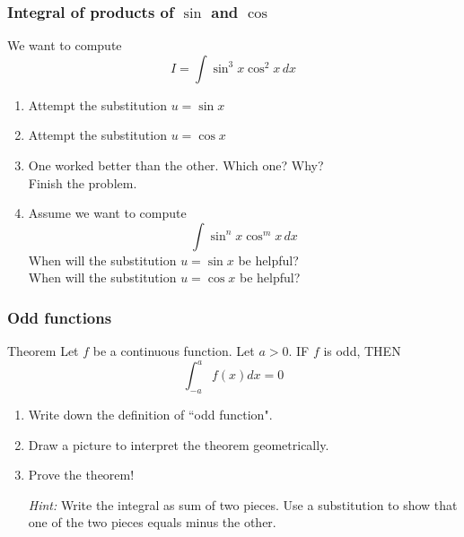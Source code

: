 \documentclass[14pt]{beamer}
\begin{document}
\begin{frame}[t]
	\fontsize{13}{13}\selectfont
	\frametitle{Integral of products of $\sin$ and $\cos$}
	We want to compute
	\vspace{-.5cm}
	\[
		I = \int \sin^{3}x \cos^{2}x \, dx
	\]

	\begin{enumerate}
		\item Attempt the substitution $\displaystyle u = \sin x$

		\item Attempt the substitution $\displaystyle u = \cos x$

		\item One worked better than the other. Which one? Why? \\ Finish the
			problem.

		\item Assume we want to compute
			\[
				\int \sin^{n}x \cos^{m}x \, dx
			\]
			When will the substitution $\displaystyle u = \sin x$ be helpful? \\ When
			will the substitution $\displaystyle u = \cos x$ be helpful?
	\end{enumerate}
\end{frame}

\begin{frame}[t]
	\fontsize{13}{13}\selectfont
	\frametitle{Odd functions}

	\begin{block}{Theorem}
		Let $f$ be a continuous function. Let $a >0$. IF $f$ is odd, THEN
		\[
			\int_{-a}^{a}f(x) dx = 0
		\]
	\end{block}


	\begin{enumerate}
		\item Write down the definition of ``odd function".

		\item Draw a picture to interpret the theorem geometrically.

		\item Prove the theorem!

			\emph{Hint:} Write the integral as sum of two pieces. Use a substitution to
			show that one of the two pieces equals minus the other.
	\end{enumerate}
\end{frame}
\end{document}

